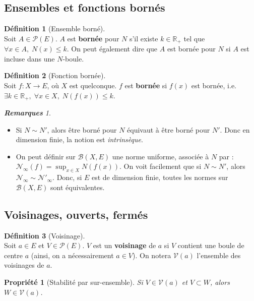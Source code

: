\documentclass[12pt]{book}
\let\ensembleNombre\mathbb
\newcommand*\R{\ensuremath{\ensembleNombre{R}}}
\newcommand*\B{\ensuremath{\mathcal B}}
\newtheorem*{prop}{Propriété}
\theoremstyle{definition}
\newtheorem*{defi}{Définition}
\theoremstyle{remark}
\newtheorem*{rems}{\textbf{Remarques}}
\newenvironment{fdef}
  {\begin{mdframed}[roundcorner=10pt, linewidth=1pt]\begin{defi}}
  {\end{defi}\end{mdframed}}
\begin{document}
		\subsection{Ensembles et fonctions bornés}
	\begin{fdef}[Ensemble borné]\mbox{~}\\
	Soit $A \in \mathcal P(E)$. $A$ est \textbf{bornée} pour $N$ s'il existe $k \in \R_+$ tel que $\forall x \in A,\; N(x) \leq k$. On peut également dire que $A$ est bornée pour $N$ si $A$ est incluse dans une $N$-boule.
	\end{fdef}
	
	\begin{fdef}[Fonction bornée]\mbox{~}\\
	Soit $f : X \longrightarrow E$, où $X$ est quelconque. $f$ est \textbf{bornée} si $f(x)$ est bornée, i.e. $\exists k \in \R_+, \; \forall x \in X, \; N(f(x)) \leq k$.
	\end{fdef}
	
	\begin{rems}\mbox{~}\\
	\begin{itemize}
	\item Si $N \sim N'$, alors être borné pour $N$ équivaut à être borné pour $N'$. Donc en dimension finie, la notion est \textit{intrinsèque}.
	\item On peut définir sur $\B(X,E)$ une norme uniforme, associée à $N$ par : $\mathcal N_\infty (f) = \sup_{x\in X} N(f(x))$. On voit facilement que si $N \sim N'$, alors $\mathcal N_\infty \sim \mathcal N'_\infty$. Donc, si $E$ est de dimension finie, toutes les normes sur $\B(X,E)$ sont équivalentes.
	\end{itemize}
	\end{rems}
	
		\subsection{Voisinages, ouverts, fermés}
	\begin{fdef}[Voisinage]\mbox{~}\\
	Soit $a \in E$ et $V \in \mathcal P(E)$. $V$ est un \textbf{voisinage} de $a$ si $V$ contient une boule de centre $a$ (ainsi, on a nécessairement $a \in V$). On notera $\mathcal V(a)$ l'ensemble des voisinages de $a$.
	\end{fdef}
	
	\begin{prop}[Stabilité par sur-ensemble]
	Si $V \in \mathcal V(a)$ et $V \subset W$, alors $W \in \mathcal V(a)$.
	\end{prop}
	
\end{document}
